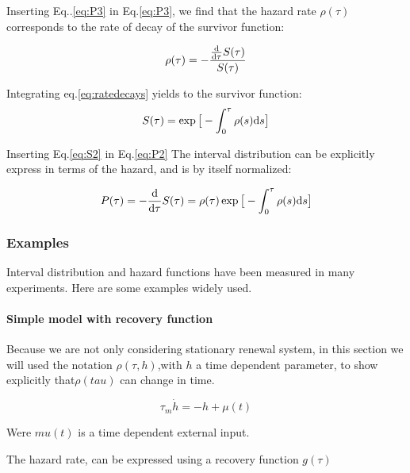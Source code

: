\documentclass[a4paper,11pt,twoside]{article}
\def \dd  {{\rm d}}
\numberwithin{equation}{section}
\begin{document}
Inserting Eq..\eqref{eq:P3} in Eq.\eqref{eq:P3}, we find that the hazard rate $\rho(\tau)$ corresponds to the rate of decay of the survivor function:

\begin{equation}
\label{eq:ratedecays}
\rho(\tau)=-\frac{\frac{\dd}{\dd \tau}S(\tau)}{S(\tau)}
\end{equation}

Integrating eq.\ref{eq:ratedecays} yields to the survivor function:
\begin{equation}
\label{eq:S2}
S(\tau)=\exp\big[-\int_0^\tau\rho(s)\dd s\big]
\end{equation}

 Inserting Eq.\eqref{eq:S2} in Eq.\eqref{eq:P2} The interval distribution can be explicitly express in terms of the hazard, and is by itself normalized:

\begin{equation}
\label{eq:P4}
P(\tau)=-\frac{\dd}{\dd \tau}S(\tau)=\rho(\tau)\exp\big[-\int_0^\tau\rho(s)\dd s\big]
\end{equation}



\subsubsection{Examples }
\label{sec:ex}

Interval distribution and hazard functions have been measured in many experiments. Here are some examples widely used.



\paragraph{Simple model with recovery function}


Because we are not only considering stationary renewal system, in this section we will used the notation $\rho(\tau,h)$,with $h$ a time dependent parameter, to show explicitly that$\rho(tau)$ can change in time.


\begin{equation}
\label{eq:hi}
\tau_m\dot h=-h+\mu(t)
\end{equation}


Were $mu(t)$ is a time dependent external input.

The hazard rate, can be expressed using a recovery function $g(\tau)$
\end{document}
